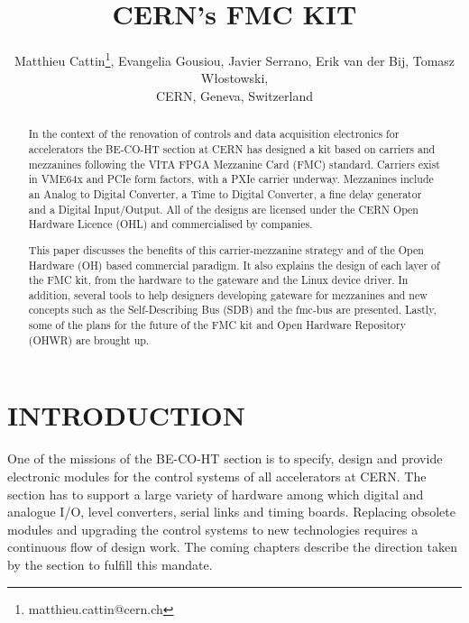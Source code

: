 \documentclass{JAC2003}
\begin{document}
\title{CERN's FMC KIT}

\author{Matthieu Cattin\thanks{matthieu.cattin@cern.ch}, Evangelia Gousiou, Javier Serrano, Erik van der Bij, Tomasz W\l{}ostowski,\\
CERN, Geneva, Switzerland}

\maketitle

\begin{abstract}
  In the context of the renovation of controls and data acquisition electronics for accelerators the BE-CO-HT section at CERN has designed a kit based on carriers and mezzanines following the VITA FPGA Mezzanine Card (FMC) standard. Carriers exist in VME64x and PCIe form factors, with a PXIe carrier underway. Mezzanines include an Analog to Digital Converter, a Time to Digital Converter, a fine delay generator and a Digital Input/Output. All of the designs are licensed under the CERN Open Hardware Licence (OHL) and commercialised by companies.

This paper discusses the benefits of this carrier-mezzanine strategy and of the Open Hardware (OH) based commercial paradigm.
It also explains the design of each layer of the FMC kit, from the hardware to the gateware and the Linux device driver.
In addition, several tools to help designers developing gateware for mezzanines and new concepts such as the Self-Describing Bus (SDB) and the fmc-bus are presented.
Lastly, some of the plans for the future of the FMC kit and Open Hardware Repository (OHWR) are brought up.
\end{abstract}

\section{INTRODUCTION}
One of the missions of the BE-CO-HT section is to specify, design and provide electronic modules for the control systems of all accelerators at CERN.
The section has to support a large variety of hardware among which digital and analogue I/O, level converters, serial links and timing boards.
Replacing obsolete modules and upgrading the control systems to new technologies requires a continuous flow of design work.
The coming chapters describe the direction taken by the section to fulfill this mandate.
\end{document}
